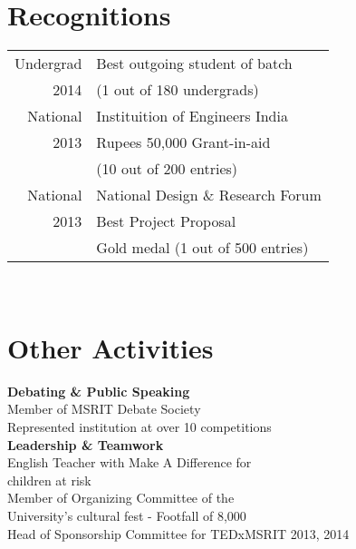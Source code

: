 \documentclass[10pt]{article} %
\begin{document}
{\begin{minipage}[t]{0.4\textwidth}

\section{\textbf{Recognitions}} 
\begin{tabular}{rl}
Undergrad & Best outgoing student of batch\\
2014 &  (1 out of 180 undergrads) \\
National & Instituition of Engineers India \\
2013  &  Rupees 50,000 Grant-in-aid  \\
         & (10 out of 200 entries) \\
National & National Design \& Research Forum  \\
2013     &  Best Project Proposal \\
         & Gold medal (1 out of 500 entries)  \\
\end{tabular}\\[10pt]


\section{\textbf{Other Activities}}
\textbf{Debating \& Public Speaking}\\
\textbullet{} Member of MSRIT Debate Society \\ \textbullet{} Represented institution at over 10 competitions \\
\textbf{Leadership \& Teamwork}\\
\textbullet{} English Teacher with Make A Difference for \\ children at risk \\ \textbullet{} Member of Organizing Committee of the \\University's cultural fest - Footfall of 8,000 \\ \textbullet{} Head of Sponsorship Committee for TEDxMSRIT 2013, 2014 

	

\end{minipage}}
\end{document}
